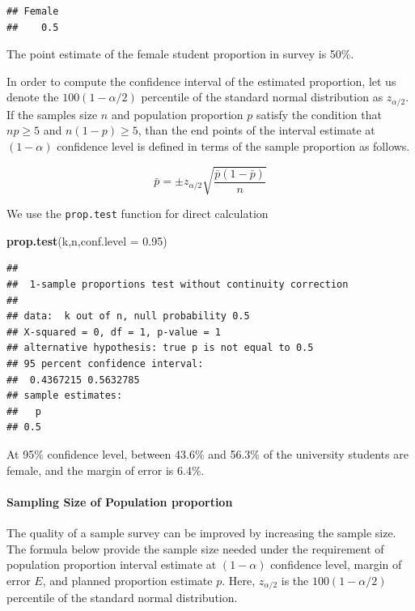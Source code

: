 \documentclass[]{article}
\newenvironment{Shaded}{\begin{snugshade}}{\end{snugshade}}
\newcommand{\KeywordTok}[1]{\textcolor[rgb]{0.13,0.29,0.53}{\textbf{{#1}}}}
\newcommand{\DataTypeTok}[1]{\textcolor[rgb]{0.13,0.29,0.53}{{#1}}}
\newcommand{\FloatTok}[1]{\textcolor[rgb]{0.00,0.00,0.81}{{#1}}}
\newcommand{\NormalTok}[1]{{#1}}
\numberwithin{equation}{section}
\begin{document}
\begin{verbatim}
## Female 
##    0.5
\end{verbatim}

The point estimate of the female student proportion in survey is 50\%.

In order to compute the confidence interval of the estimated proportion,
let us denote the \(100(1-\alpha/2)\) percentile of the standard normal
distribution as \(z_{\alpha/2}\). If the samples size \(n\) and
population proportion \(p\) satisfy the condition that \(np \geq 5\) and
\(n(1-p) \geq 5\), than the end points of the interval estimate at
\((1-\alpha)\) confidence level is defined in terms of the sample
proportion as follows.

\[
      \bar{p} = \pm z_{\alpha/2} \sqrt{\frac{\bar{p}(1-\bar{p})}{n}} 
\]

We use the \texttt{prop.test} function for direct calculation

\begin{Shaded}
\begin{Highlighting}[]
\KeywordTok{prop.test}\NormalTok{(k,n,}\DataTypeTok{conf.level =} \FloatTok{0.95}\NormalTok{)}
\end{Highlighting}
\end{Shaded}

\begin{verbatim}
## 
##  1-sample proportions test without continuity correction
## 
## data:  k out of n, null probability 0.5
## X-squared = 0, df = 1, p-value = 1
## alternative hypothesis: true p is not equal to 0.5
## 95 percent confidence interval:
##  0.4367215 0.5632785
## sample estimates:
##   p 
## 0.5
\end{verbatim}

At 95\% confidence level, between 43.6\% and 56.3\% of the university
students are female, and the margin of error is 6.4\%.

\paragraph{Sampling Size of Population
proportion}\label{sampling-size-of-population-proportion}

The quality of a sample survey can be improved by increasing the sample
size. The formula below provide the sample size needed under the
requirement of population proportion interval estimate at
\((1 -\alpha)\) confidence level, margin of error \(E\), and planned
proportion estimate \(p\). Here, \(z_{\alpha/2}\) is the
\(100(1-\alpha/2)\) percentile of the standard normal distribution.
\end{document}
